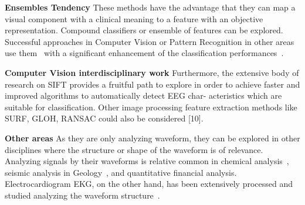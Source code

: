 \textbf{Ensembles Tendency}
These methods have the advantage that they can map a visual component with a clinical meaning to a feature with an objective representation. Compound classifiers or ensemble of features can be explored.  Successful approaches in Computer Vision or Pattern Recognition in other areas use them~\cite{Criminisi2013} with a significant enhancement of the classification performances~\cite{Gu2012}.


\textbf{Computer Vision interdisciplinary work}
Furthermore, the extensive body of research on SIFT provides a fruitful path to explore in order to achieve faster and improved algorithms to automatically detect EEG char- acteristics which are suitable for classification. Other image processing feature extraction methods like SURF, GLOH, RANSAC could also be considered [10].

\textbf{Other areas}
As they are only analyzing waveform, they can be explored in other disciplines where the structure or shape of the waveform is of relevance.  Analyzing signals by their waveforms is relative common in chemical analysis~\cite{Skoog2000}, seismic analysis in Geology~\cite{Owens1984}, and quantitative financial analysis.  Electrocardiogram EKG, on the other hand, has been extensively processed and studied analyzing the waveform structure~\cite{Stockman1976}.



%

